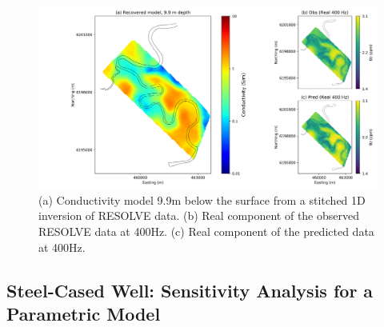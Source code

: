 {%
\begin{figure}[htb!]
    \centering
    \includegraphics[width=\textwidth]{images/resolve_cond_9m.png}
\caption{
    (a) Conductivity model 9.9m below the surface from a stitched 1D inversion of
    RESOLVE data. (b) Real component of the observed RESOLVE data at 400Hz. (c)
    Real component of the predicted data at 400Hz.
}
\label{fig:bookyInv}
\end{figure}
}



\subsection{Steel-Cased Well: Sensitivity Analysis for a Parametric Model}
\label{sec:steelcasing}

